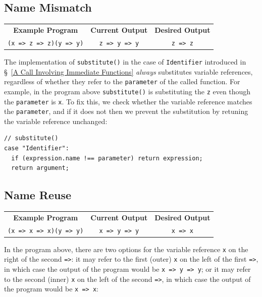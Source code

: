 \documentclass[12pt, oneside]{book}
\begin{document}
\subsection{Name Mismatch}

\begin{center}
\begin{tabular}{c|c|c}
\textbf{Example Program} & \textbf{Current Output} & \textbf{Desired Output} \\
\texttt{(x => z => z)(y => y)} & \texttt{z => y => y} & \texttt{z => z} \\
\end{tabular}
\end{center}

The implementation of \texttt{substitute()} in the case of \texttt{Identifier} introduced in §~\ref{A Call Involving Immediate Functions} \emph{always} substitutes variable references, regardless of whether they refer to the \texttt{parameter} of the called function. For example, in the program above \texttt{substitute()} is substituting the \texttt{z} even though the \texttt{parameter} is \texttt{x}. To fix this, we check whether the variable reference matches the \texttt{parameter}, and if it does not then we prevent the substitution by retuning the variable reference unchanged:

\begin{verbatim}
// substitute()
case "Identifier":
  if (expression.name !== parameter) return expression;
  return argument;
\end{verbatim}

\subsection{Name Reuse}

\begin{center}
\begin{tabular}{c|c|c}
\textbf{Example Program} & \textbf{Current Output} & \textbf{Desired Output} \\
\texttt{(x => x => x)(y => y)} & \texttt{x => y => y} & \texttt{x => x} \\
\end{tabular}
\end{center}

In the program above, there are two options for the variable reference \texttt{x} on the right of the second \texttt{=>}: it may refer to the first (outer) \texttt{x} on the left of the first \texttt{=>}, in which case the output of the program would be \texttt{x => y => y}; or it may refer to the second (inner) \texttt{x} on the left of the second \texttt{=>}, in which case the output of the program would be \texttt{x => x}:
\end{document}
